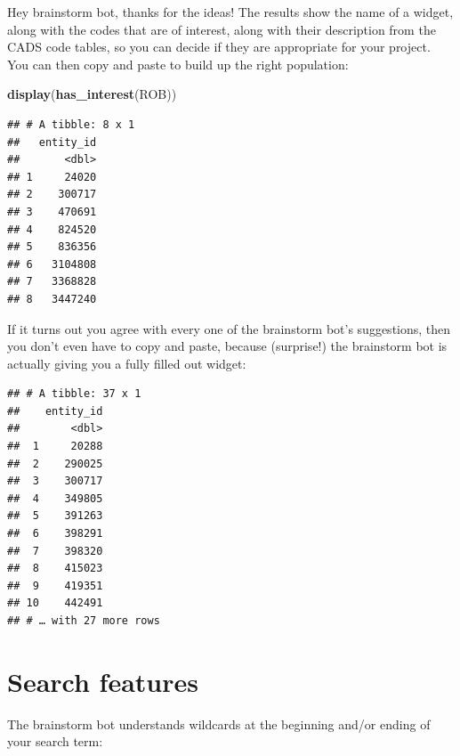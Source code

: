 \documentclass[]{book}
\newenvironment{Shaded}{\begin{snugshade}}{\end{snugshade}}
\newcommand{\CommentTok}[1]{\textcolor[rgb]{0.56,0.35,0.01}{\textit{#1}}}
\newcommand{\KeywordTok}[1]{\textcolor[rgb]{0.13,0.29,0.53}{\textbf{#1}}}
\newcommand{\NormalTok}[1]{#1}
\newcommand{\OperatorTok}[1]{\textcolor[rgb]{0.81,0.36,0.00}{\textbf{#1}}}
\newcommand{\StringTok}[1]{\textcolor[rgb]{0.31,0.60,0.02}{#1}}
\begin{document}
Hey brainstorm bot, thanks for the ideas! The results show the name of a widget, along with the codes that are of interest, along with their description from the CADS code tables, so you can decide if they are appropriate for your project. You can then copy and paste to build up the right population:

\begin{Shaded}
\begin{Highlighting}[]
\KeywordTok{display}\NormalTok{(}\KeywordTok{has_interest}\NormalTok{(ROB))}
\end{Highlighting}
\end{Shaded}

\begin{verbatim}
## # A tibble: 8 x 1
##   entity_id
##       <dbl>
## 1     24020
## 2    300717
## 3    470691
## 4    824520
## 5    836356
## 6   3104808
## 7   3368828
## 8   3447240
\end{verbatim}

If it turns out you agree with every one of the brainstorm bot's suggestions, then you don't even have to copy and paste, because (surprise!) the brainstorm bot is actually giving you a fully filled out widget:

\begin{Shaded}
\end{Shaded}

\begin{verbatim}
## # A tibble: 37 x 1
##    entity_id
##        <dbl>
##  1     20288
##  2    290025
##  3    300717
##  4    349805
##  5    391263
##  6    398291
##  7    398320
##  8    415023
##  9    419351
## 10    442491
## # … with 27 more rows
\end{verbatim}

\hypertarget{search-features}{%
\section{Search features}\label{search-features}}

The brainstorm bot understands wildcards at the beginning and/or ending of your search term:
\end{document}
